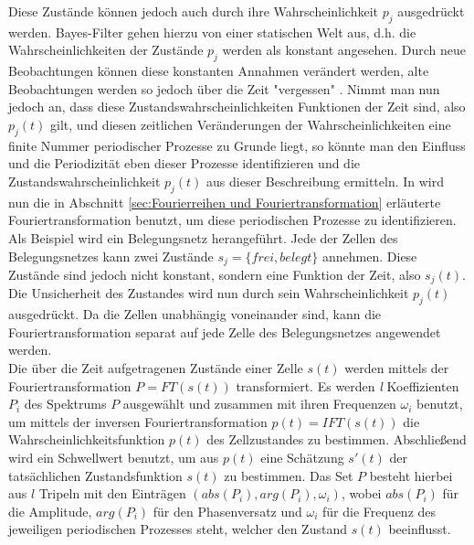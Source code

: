 Diese Zustände können jedoch auch durch ihre Wahrscheinlichkeit $p_j$ ausgedrückt werden. Bayes-Filter gehen hierzu von einer statischen Welt aus, d.h. die Wahrscheinlichkeiten der Zustände $p_j$ werden als konstant angesehen. Durch neue Beobachtungen können diese konstanten Annahmen verändert werden, alte Beobachtungen werden so jedoch über die Zeit "vergessen" \cite{Krajnik.2014}. Nimmt man nun jedoch an, dass diese Zustandswahrscheinlichkeiten Funktionen der Zeit sind, also $p_j (t)$ gilt, und diesen zeitlichen Veränderungen der Wahrscheinlichkeiten eine finite Nummer periodischer Prozesse zu Grunde liegt, so könnte man den Einfluss und die Periodizität eben dieser Prozesse identifizieren und die Zustandswahrscheinlichkeit $p_j (t)$ aus dieser Beschreibung ermitteln. In \cite{Krajnik.2014} wird nun die in Abschnitt \ref{sec:Fourierreihen und Fouriertransformation} erläuterte Fouriertransformation benutzt, um diese periodischen Prozesse zu identifizieren. Als Beispiel wird ein Belegungsnetz herangeführt. Jede der Zellen des Belegungsnetzes kann zwei Zustände $s_j = \{frei, belegt\}$ annehmen. Diese Zustände sind jedoch nicht konstant, sondern eine Funktion der Zeit, also $s_j (t)$. Die Unsicherheit des Zustandes wird nun durch sein Wahrscheinlichkeit $p_j (t)$ ausgedrückt. Da die Zellen unabhängig voneinander sind, kann die Fouriertransformation separat auf jede Zelle des Belegungsnetzes angewendet werden. \\ Die über die Zeit aufgetragenen Zustände einer Zelle $s(t)$ werden mittels der Fouriertransformation $P = FT(s(t))$ transformiert. Es werden \textit{l} Koeffizienten $P_i$ des Spektrums $P$ ausgewählt und zusammen mit ihren Frequenzen $\omega_i$ benutzt, um mittels der inversen Fouriertransformation $p(t) = IFT(s(t))$ die Wahrscheinlichkeitsfunktion $p(t)$ des Zellzustandes zu bestimmen. Abschließend wird ein Schwellwert benutzt, um aus $p(t)$ eine Schätzung $s'(t)$ der tatsächlichen Zustandsfunktion $s(t)$ zu bestimmen. Das Set $P$ besteht hierbei aus $l$ Tripeln mit den Einträgen $(abs(P_i), arg(P_i), \omega_i)$, wobei $abs(P_i)$ für die Amplitude, $arg(P_i)$ für den Phasenversatz und $\omega_i$ für die Frequenz des jeweiligen periodischen Prozesses steht, welcher den Zustand $s(t)$ beeinflusst. \\

